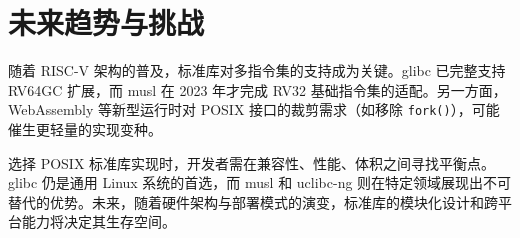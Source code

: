 \chapter{未来趋势与挑战}
随着 RISC-V 架构的普及，标准库对多指令集的支持成为关键。glibc 已完整支持 RV64GC 扩展，而 musl 在 2023 年才完成 RV32 基础指令集的适配。另一方面，WebAssembly 等新型运行时对 POSIX 接口的裁剪需求（如移除 \verb!fork()!），可能催生更轻量的实现变种。\par
选择 POSIX 标准库实现时，开发者需在兼容性、性能、体积之间寻找平衡点。glibc 仍是通用 Linux 系统的首选，而 musl 和 uclibc-ng 则在特定领域展现出不可替代的优势。未来，随着硬件架构与部署模式的演变，标准库的模块化设计和跨平台能力将决定其生存空间。\par
